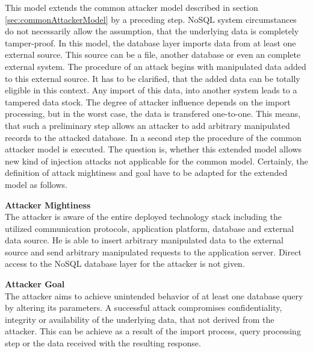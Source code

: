 This model extends the common attacker model described in section \ref{sec:commonAttackerModel} by a preceding step. NoSQL system circumstances do not necessarily allow the assumption, that the underlying data is completely tamper-proof. In this model, the database layer imports data from at least one external source. This source can be a file, another database or even an complete external system. The procedure of an attack begins with manipulated data added to this external source. It has to be clarified, that the added data can be totally eligible in this context. Any import of this data, into another system leads to a tampered data stock. The degree of attacker influence depends on the import processing, but in the worst case, the data is transfered one-to-one. This means, that such a preliminary step allows an attacker to add arbitrary manipulated records to the attacked database. In a second step the procedure of the common attacker model is executed. The question is, whether this extended model allows new kind of injection attacks not applicable for the common model. Certainly, the definition of attack mightiness and goal have to be adapted for the extended model as follows. \\


\begin{minipage}[t]{0.48\textwidth}
  \textbf{Attacker Mightiness} \\ 
  The attacker is aware of the entire deployed technology stack including the utilized communication protocols, application platform, database and external data source. He is able to insert arbitrary manipulated data to the external source and send arbitrary manipulated requests to the application server. Direct access to the NoSQL database layer for the attacker is not given.
\end{minipage}
\hfill
\begin{minipage}[t]{0.48\textwidth}
  \textbf{Attacker Goal} \\ 
  The attacker aims to achieve unintended behavior of at least one database query by altering its parameters. A successful attack compromises confidentiality, integrity or availability of the underlying data, that not derived from the attacker. This can be achieve as a result of the import process, query processing step or the data received with the resulting response.
\end{minipage}


